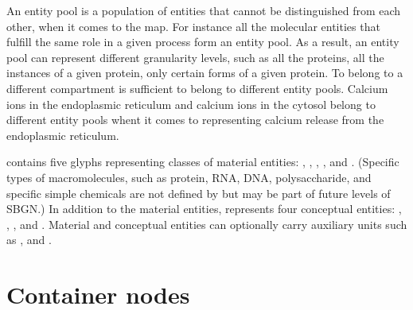An entity pool is a population of entities that cannot be distinguished from each other, when it comes to the \SBGNPDLone map. For instance all the molecular  entities that fulfill the same role in a given process form an entity pool. As a result, an entity pool can represent different granularity levels, such as all the proteins, all the instances of a given protein, only certain forms of a given protein. To belong to a different compartment is sufficient to belong to different entity pools. Calcium ions in the endoplasmic reticulum and calcium ions in the cytosol belong to different entity pools whent it comes to representing calcium release from the endoplasmic reticulum.

\SBGNPDLone{} contains five glyphs representing classes of material entities: , , , , and .  (Specific types of macromolecules, such as protein, RNA, DNA, polysaccharide, and specific simple chemicals are not defined by \SBGNPDLone but may be part of future levels of SBGN.)  In addition to the material entities, \SBGNPDLone{} represents four conceptual entities: , , , and .  Material and conceptual entities can optionally carry auxiliary units such as ,  and .




















\section{Container nodes}\label{sec:CNs}

